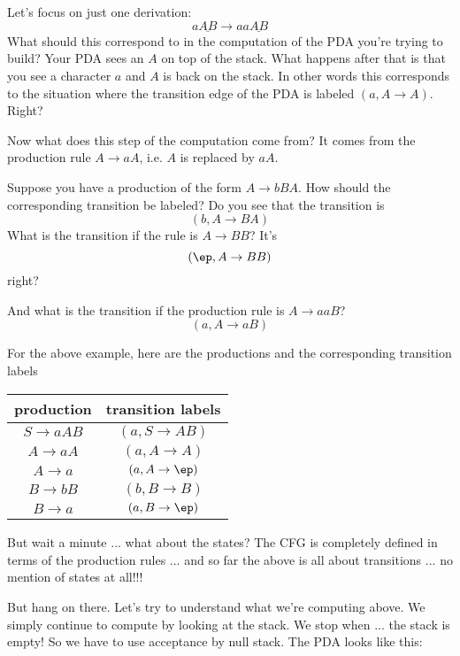 Let's focus on just one derivation:
\[
a \underline{AB} \rightarrow aa \underline{AB}
\]
What should this correspond to in the computation of the PDA you're trying to
build?
Your PDA sees an $A$ on top of the stack.
What happens after that is that you see a character $a$ and $A$ is back on the
stack.
In other words this corresponds to the situation where the transition edge
of the PDA is labeled $(a, A \rightarrow A)$. Right?

Now what does this step of the computation come from?
It comes from the production rule $A \rightarrow aA$, i.e. $A$ is replaced by
$aA$.

Suppose you have a production of the form $A \rightarrow bBA$.
How should the corresponding transition be labeled?
Do you see that the transition is
\[
(b, A \rightarrow BA)
\]
What is the transition if the rule is $A \rightarrow BB$?
It's
\[
(\ep, A \rightarrow BB)
\]
right?

And what is the transition if the production rule is $A \rightarrow aaB$?
\[
(a, A \rightarrow aB)
\]

For the above example, here are the productions and the corresponding 
transition labels
\begin{center}
\begin{tabular}{|c|c|} \hline
production          & transition labels \\ \hline
$S \rightarrow aAB$ & $(a, S \rightarrow AB)$  \\
$A \rightarrow aA$  & $(a, A \rightarrow A)$  \\
$A \rightarrow a$   & $(a, A \rightarrow \ep)$ \\
$B \rightarrow bB$  & $(b, B \rightarrow B)$ \\
$B \rightarrow a$   & $(a, B \rightarrow \ep)$ \\ \hline
\end{tabular}
\end{center}

But wait a minute ... what about the states?
The CFG is completely defined in terms of the production rules ... and so far
the above is all about transitions ... no mention of states at all!!!

But hang on there.
Let's try to understand what we're computing above.
We simply continue to compute by looking at the stack.
We stop when ... the stack is empty!
So we have to use acceptance by null stack.
The PDA looks like this:

\begin{center}
\end{center}
    


